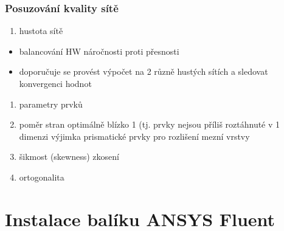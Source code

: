\documentclass[letterpaper,10pt,czech]{sphinxmanual}
\begin{document}
\subsection{Posuzování kvality sítě}
\label{\detokenize{prednaska_23092022:posuzovani-kvality-site}}\begin{enumerate}
%
\item {} 
\sphinxAtStartPar
hustota sítě

\end{enumerate}
\begin{itemize}
\item {} 
\sphinxAtStartPar
balancování HW náročnosti proti přesnosti

\item {} 
\sphinxAtStartPar
doporučuje se provést výpočet na 2 různě hustých sítích a sledovat konvergenci hodnot

\end{itemize}
\begin{enumerate}
%
\setcounter{enumi}{1}
\item {} 
\sphinxAtStartPar
parametry prvků

\item {} 
\sphinxAtStartPar
poměr stran
\sphinxhyphen{} optimálně blízko 1 (tj. prvky nejsou příliš roztáhnuté v 1 dimenzi
\sphinxhyphen{} výjimka \sphinxhyphen{} prismatické prvky pro rozlišení mezní vrstvy

\item {} 
\sphinxAtStartPar
šikmost (skewness) \sphinxhyphen{} zkosení

\item {} 
\sphinxAtStartPar
ortogonalita

\end{enumerate}

\sphinxstepscope


\chapter{Instalace balíku ANSYS Fluent}
\label{\detokenize{instalace_fluentu:instalace-baliku-ansys-fluent}}\label{\detokenize{instalace_fluentu::doc}}


\renewcommand{\indexname}{Rejstřík}
\printindex
\end{document}
